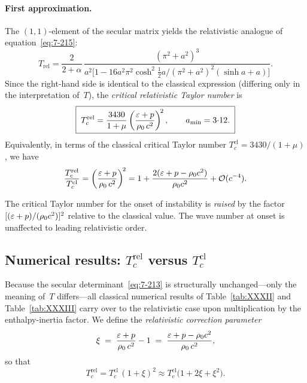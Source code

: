 \paragraph{First approximation.}
The $(1,1)$-element of the secular matrix yields the relativistic
analogue of equation~\eqref{eq:7-215}:
\begin{equation}
\label{eq:rel-7-215}
T_{\mathrm{rel}}
  = \frac{2}{2+\alpha}\,
    \frac{(\pi^{2}+a^{2})^{3}}{a^{2}
      \bigl[1
       - 16a^{2}\pi^{2}\cosh^{2}\!\tfrac{1}{2}a
         /(\pi^{2}+a^{2})^{2}(\sinh a + a)\bigr]}.
\end{equation}
Since the right-hand side is identical to the classical expression
(differing only in the interpretation of~$T$), the \emph{critical
relativistic Taylor number} is
\begin{equation}
\label{eq:rel-7-216}
\boxed{\;
T_{c}^{\mathrm{rel}}
  = \frac{3430}{1+\mu}
    \left(\frac{\varepsilon+p}{\rho_0\,c^{2}}\right)^{\!2},
  \qquad
  a_{\min} = 3{\cdot}12.
\;}
\end{equation}
Equivalently, in terms of the classical critical Taylor number
$T_{c}^{\mathrm{cl}} = 3430/(1+\mu)$, we have
\begin{equation}
\label{eq:rel-7-217}
\frac{T_{c}^{\mathrm{rel}}}{T_{c}^{\mathrm{cl}}}
  = \left(\frac{\varepsilon+p}{\rho_0\,c^{2}}\right)^{\!2}
  = 1 + \frac{2(\varepsilon + p - \rho_0 c^{2})}{\rho_0 c^{2}}
      + \mathcal{O}(c^{-4}).
\end{equation}

\begin{relcorrection}
The critical Taylor number for the onset of instability is
\emph{raised} by the factor $[(\varepsilon+p)/(\rho_0 c^{2})]^{2}$
relative to the classical value.  The wave number at onset is
unaffected to leading relativistic order.
\end{relcorrection}

\subsection{Numerical results: $T_{c}^{\mathrm{rel}}$ versus
$T_{c}^{\mathrm{cl}}$}\label{sec:rel-71-numerical}

Because the secular determinant~\eqref{eq:7-213} is structurally
unchanged—only the meaning of~$T$ differs—all classical numerical
results of Table~\ref{tab:XXXII} and Table~\ref{tab:XXXIII} carry
over to the relativistic case upon multiplication by the
enthalpy-inertia factor.  We define the \emph{relativistic
correction parameter}
\begin{equation}
\label{eq:rel-7-218}
\xi \;=\; \frac{\varepsilon + p}{\rho_0\,c^{2}} - 1
      \;=\; \frac{\varepsilon + p - \rho_0 c^{2}}{\rho_0\,c^{2}},
\end{equation}
so that
\begin{equation}
\label{eq:rel-7-219}
T_{c}^{\mathrm{rel}}
  = T_{c}^{\mathrm{cl}}\,(1+\xi)^{2}
  \approx T_{c}^{\mathrm{cl}}
          \bigl(1 + 2\xi + \xi^{2}\bigr).
\end{equation}

